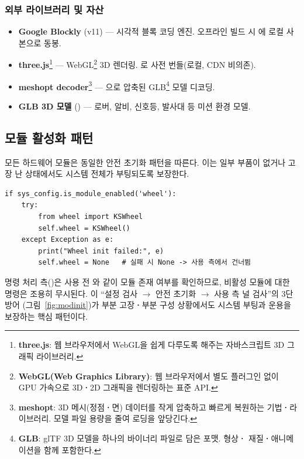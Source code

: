 \subsubsection{외부 라이브러리 및 자산}

\begin{itemize}
  \item \textbf{Google Blockly} (v11) --- 시각적 블록 코딩 엔진.
        오프라인 빌드 시 에 로컬 사본으로 동봉.
  \item \textbf{three.js}\footnote{\textbf{three.js}: 웹 브라우저에서 WebGL을 쉽게 다루도록
        해주는 자바스크립트 3D 그래픽 라이브러리.} --- WebGL\footnote{\textbf{WebGL(Web
        Graphics Library)}: 웹 브라우저에서 별도 플러그인 없이 GPU 가속으로 3D\textbf{·}2D
        그래픽을 렌더링하는 표준 API.} 3D 렌더링.
        로 사전 번들(로컬, CDN 비의존).
  \item \textbf{meshopt decoder}\footnote{\textbf{meshopt}: 3D 메시(정점\textbf{·}면) 데이터를
        작게 압축하고 빠르게 복원하는 기법\textbf{·}라이브러리. 모델 파일 용량을 줄여 로딩을
        앞당긴다.} --- 으로 압축된
        GLB\footnote{\textbf{GLB}: glTF 3D 모델을 하나의 바이너리 파일로 담은 포맷. 형상\textbf{·}
        재질\textbf{·}애니메이션을 함께 포함한다.} 모델 디코딩.
  \item \textbf{GLB 3D 모델} () --- 로버, 알비, 신호등, 발사대 등
        미션 환경 모델.
\end{itemize}

\subsection{모듈 활성화 패턴}

모든 하드웨어 모듈은 동일한 안전 초기화 패턴을 따른다. 이는 일부 부품이
없거나 고장 난 상태에서도 시스템 전체가 부팅되도록 보장한다.

\begin{verbatim}
if sys_config.is_module_enabled('wheel'):
    try:
        from wheel import KSWheel
        self.wheel = KSWheel()
    except Exception as e:
        print("Wheel init failed:", e)
        self.wheel = None   # 실패 시 None -> 사용 측에서 건너뜀
\end{verbatim}

명령 처리 측()은 사용 전 와
같이 모듈 존재 여부를 확인하므로, 비활성 모듈에 대한 명령은 조용히 무시된다.
이 ``설정 검사 $\to$ 안전 초기화 $\to$ 사용 측 널 검사''의 3단 방어
(그림~\ref{fig:modinit})가 부분 고장\textbf{·}부분 구성 상황에서도 시스템 부팅과
운용을 보장하는 핵심 패턴이다.


